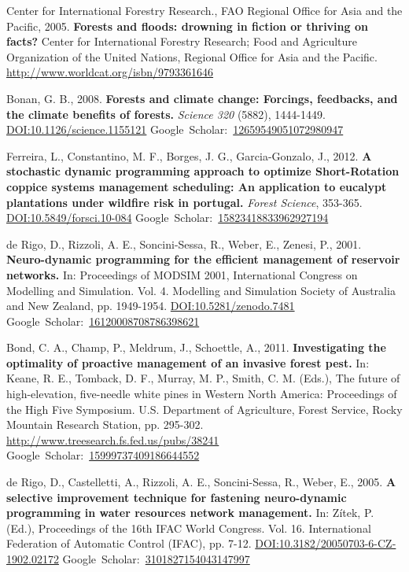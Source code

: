 \documentclass[a4paper,11pt]{article}
\newcommand{\gourl}[1]{\url{#1}}
\newcommand{\goDOI}[1]{\href{http://dx.doi.org/#1}{DOI:#1}}
\newcommand{\goScholar}[1]{{Google~Scholar}:~\href{http://scholar.google.com/scholar?cluster=#1}{#1}}
\begin{document}
\begin{footnotesize}
{\begin{thebibliography}{}
 Center for International Forestry Research., FAO Regional Office for Asia and the Pacific, 2005. \textbf{Forests and floods: drowning in fiction or thriving on facts?} Center for International Forestry Research; Food and Agriculture Organization of the United Nations, Regional Office for Asia and the Pacific. \gourl {http://www.worldcat.org/isbn/9793361646}

 Bonan, G. B., 2008. \textbf{Forests and climate change: Forcings, feedbacks, and the climate benefits of forests.} \emph{Science 320} (5882), 1444-1449. \goDOI{10.1126/science.1155121} \goScholar{12659549051072980947}

 Ferreira, L., Constantino, M. F., Borges, J. G., Garcia-Gonzalo, J., 2012. \textbf{A stochastic dynamic programming approach to optimize Short-Rotation coppice systems management scheduling: An application to eucalypt plantations under wildfire risk in portugal.} \emph{Forest Science}, 353-365. \goDOI{10.5849/forsci.10-084} \goScholar{15823418833962927194}

 de Rigo, D., Rizzoli, A. E., Soncini-Sessa, R., Weber, E., Zenesi, P., 2001. \textbf{Neuro-dynamic programming for the efficient management of reservoir networks.} In: Proceedings of MODSIM 2001, International Congress on Modelling and Simulation. Vol. 4. Modelling and Simulation Society of Australia and New Zealand, pp. 1949-1954. \goDOI {10.5281/zenodo.7481} \goScholar{16120008708786398621}

 Bond, C. A., Champ, P., Meldrum, J., Schoettle, A., 2011. \textbf{Investigating the optimality of proactive management of an invasive forest pest.} In: Keane, R. E., Tomback, D. F., Murray, M. P., Smith, C. M. (Eds.), The future of high-elevation, five-needle white pines in Western North America: Proceedings of the High Five Symposium. U.S. Department of Agriculture, Forest Service, Rocky Mountain Research Station, pp. 295-302. \gourl {http://www.treesearch.fs.fed.us/pubs/38241} \goScholar{15999737409186644552}

 de Rigo, D., Castelletti, A., Rizzoli, A. E., Soncini-Sessa, R., Weber, E., 2005. \textbf{A selective improvement technique for fastening neuro-dynamic programming in water resources network management.} In: Z\'itek, P. (Ed.), Proceedings of the 16th IFAC World Congress. Vol. 16. International Federation of Automatic Control (IFAC), pp. 7-12. \goDOI{10.3182/20050703-6-CZ-1902.02172} \goScholar{3101827154043147997}


\end{thebibliography}}
\end{footnotesize}
\end{document}
